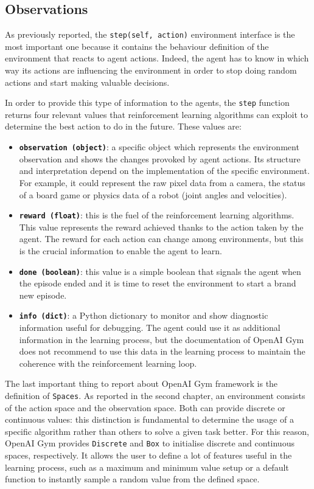 \subsection{Observations} \label{subsec:observations}

As previously reported, the \texttt{step(self, action)} environment interface is the most important one because it contains the behaviour definition of the environment that reacts to agent actions.
Indeed, the agent has to know in which way its actions are influencing the environment in order to stop doing random actions and start making valuable decisions.

In order to provide this type of information to the agents, the \texttt{step} function returns four relevant values that reinforcement learning algorithms can exploit to determine the best action to do in the future.
These values are:
\begin{itemize}
	\item \textbf{\texttt{observation (object)}}: a specific object which represents the environment observation and shows the changes provoked by agent actions.
Its structure and interpretation depend on the implementation of the specific environment.
For example, it could represent the raw pixel data from a camera, the status of a board game or physics data of a robot (joint angles and velocities).
	\item \textbf{\texttt{reward (float)}}: this is the fuel of the reinforcement learning algorithms.
This value represents the reward achieved thanks to the action taken by the agent.
The reward for each action can change among environments, but this is the crucial information to enable the agent to learn.
	\item \textbf{\texttt{done (boolean)}}: this value is a simple boolean that signals the agent when the episode ended and it is time to reset the environment to start a brand new episode.
	\item \textbf{\texttt{info (dict)}}: a Python dictionary to monitor and show diagnostic information useful for debugging.
The agent could use it as additional information in the learning process, but the documentation of OpenAI Gym does not recommend to use this data in the learning process to maintain the coherence with the reinforcement learning loop.
\end{itemize}

The last important thing to report about OpenAI Gym framework is the definition of \texttt{Spaces}.
As reported in the second chapter, an environment consists of the action space and the observation space.
Both can provide discrete or continuous values: this distinction is fundamental to determine the usage of a specific algorithm rather than others to solve a given task better.
For this reason, OpenAI Gym provides \texttt{Discrete} and \texttt{Box} to initialise discrete and continuous spaces, respectively.
It allows the user to define a lot of features useful in the learning process, such as a maximum and minimum value setup or a default function to instantly sample a random value from the defined space.

